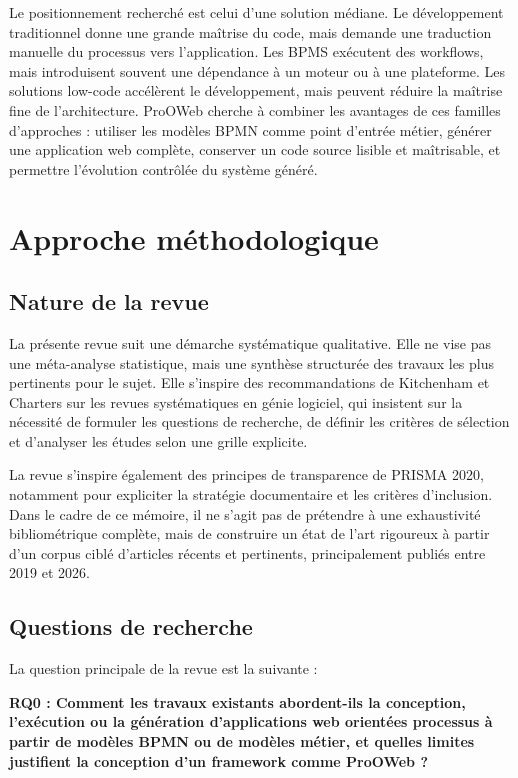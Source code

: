 \documentclass[12pt,a4paper]{article}
\begin{document}
Le positionnement recherché est celui d'une solution médiane. Le développement traditionnel donne une grande maîtrise du code, mais demande une traduction manuelle du processus vers l'application. Les BPMS exécutent des workflows, mais introduisent souvent une dépendance à un moteur ou à une plateforme. Les solutions low-code accélèrent le développement, mais peuvent réduire la maîtrise fine de l'architecture. ProOWeb cherche à combiner les avantages de ces familles d'approches : utiliser les modèles BPMN comme point d'entrée métier, générer une application web complète, conserver un code source lisible et maîtrisable, et permettre l'évolution contrôlée du système généré.

\section{Approche méthodologique}

\subsection{Nature de la revue}

La présente revue suit une démarche systématique qualitative. Elle ne vise pas une méta-analyse statistique, mais une synthèse structurée des travaux les plus pertinents pour le sujet. Elle s'inspire des recommandations de Kitchenham et Charters sur les revues systématiques en génie logiciel, qui insistent sur la nécessité de formuler les questions de recherche, de définir les critères de sélection et d'analyser les études selon une grille explicite.

La revue s'inspire également des principes de transparence de PRISMA 2020, notamment pour expliciter la stratégie documentaire et les critères d'inclusion. Dans le cadre de ce mémoire, il ne s'agit pas de prétendre à une exhaustivité bibliométrique complète, mais de construire un état de l'art rigoureux à partir d'un corpus ciblé d'articles récents et pertinents, principalement publiés entre 2019 et 2026.

\subsection{Questions de recherche}

La question principale de la revue est la suivante :

\textbf{RQ0 : Comment les travaux existants abordent-ils la conception, l'exécution ou la génération d'applications web orientées processus à partir de modèles BPMN ou de modèles métier, et quelles limites justifient la conception d'un framework comme ProOWeb ?}
\end{document}
